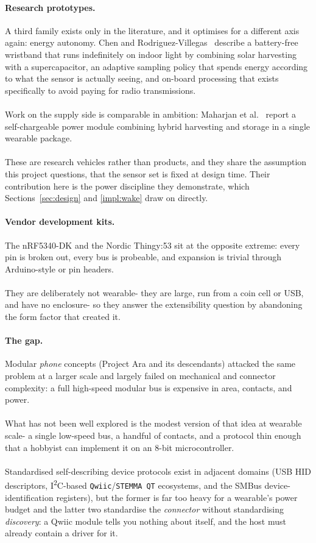\documentclass[12pt, a4paper]{article}
\begin{document}
\paragraph{Research prototypes.} A third family exists only in the literature,
and it optimises for a different axis again: energy autonomy. Chen and
Rodriguez-Villegas~\cite{chen2025} describe a battery-free wristband that runs
indefinitely on indoor light by combining solar harvesting with a supercapacitor,
an adaptive sampling policy that spends energy according to what the sensor is
actually seeing, and on-board processing that exists specifically to avoid paying
for radio transmissions.\\\\
Work on the supply side is comparable in ambition: Maharjan et al.~\cite{maharjan2020} report a self-chargeable power module
combining hybrid harvesting and storage in a single wearable package.\\\\
These are research vehicles rather than products, and they share the assumption this project
questions, that the sensor set is fixed at design time. Their contribution here
is the power discipline they demonstrate, which Sections~\ref{sec:design} and
\ref{impl:wake} draw on directly.

\paragraph{Vendor development kits.} The nRF5340-DK and the Nordic Thingy:53
sit at the opposite extreme: every pin is broken out, every bus is probeable,
and expansion is trivial through Arduino-style or pin headers.\\\\
They are
deliberately not wearable- they are large, run from a coin cell or USB, and
have no enclosure- so they answer the extensibility question by abandoning
the form factor that created it.

\paragraph{The gap.} Modular \emph{phone} concepts (Project Ara and its
descendants) attacked the same problem at a larger scale and largely failed on
mechanical and connector complexity: a full high-speed modular bus is expensive
in area, contacts, and power.\\\\
What has not been well explored is the modest
version of that idea at wearable scale- a single low-speed bus, a handful of
contacts, and a protocol thin enough that a hobbyist can implement it on an
8-bit microcontroller.\\\\
Standardised self-describing device protocols exist in
adjacent domains (USB HID descriptors, I\textsuperscript{2}C-based
\texttt{Qwiic}/\texttt{STEMMA~QT} ecosystems, and the SMBus device-identification
registers), but the former is far too heavy for a wearable's power budget and
the latter two standardise the \emph{connector} without standardising
\emph{discovery}: a Qwiic module tells you nothing about itself, and the host
must already contain a driver for it.
\end{document}
